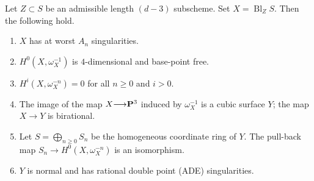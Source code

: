 \documentclass[12pt,reqno]{amsart}
\DeclareMathOperator{\Bl}{Bl}
\renewcommand{\to}{{\longrightarrow}}
\numberwithin{equation}{section}
\begin{document}
\begin{proposition}
  \label{prop:admissibleblowup}
Let $Z \subset S$ be an admissible length $(d-3)$ subscheme.
Set $X = \Bl_ZS$.
Then the following hold.
\begin{enumerate}
\item $X$ has at worst $A_n$ singularities.
\item $H^0\left(X, \omega^{-1}_X\right)$ is $4$-dimensional and base-point free.
\item $H^i(X,\omega_X^{-n}) = 0$ for all $n \geq 0$ and $i > 0$.
\item The image of the map $X \to \P^3$ induced by $\omega_X^{-1}$ is a cubic surface $Y$; the map $X \to Y$ is birational.
\item Let $S = \bigoplus_{n \geq 0} S_n$ be the homogeneous coordinate ring of $Y$.
  The pull-back map $S_n \to H^0\left(X, \omega_X^{-n}\right)$ is an isomorphism.
\item $Y$ is normal and has rational double point (ADE) singularities.
\end{enumerate}
\end{proposition}
\end{document}
